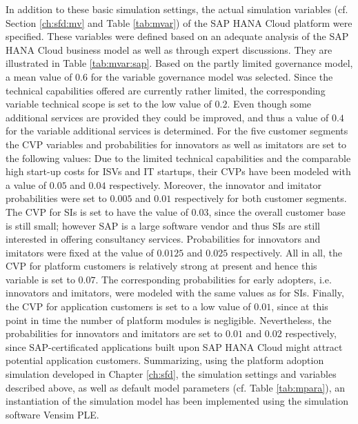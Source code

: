 In addition to these basic simulation settings, the actual simulation variables (cf. Section \ref{ch:sfd:mv} and Table \ref{tab:mvar}) of the SAP HANA Cloud platform were specified. These variables were defined based on an adequate analysis of the SAP HANA Cloud business model as well as through expert discussions. They are illustrated in Table \ref{tab:mvar:sap}. Based on the partly limited governance model, a mean value of $0.6$ for the variable governance model was selected. Since the technical capabilities offered are currently rather limited, the corresponding variable technical scope is set to the low value of $0.2$. Even though some additional services are provided they could be improved, and thus a value of $0.4$ for the variable additional services is determined. For the five customer segments the \ac{CVP} variables and probabilities for innovators as well as imitators are set to the following values: Due to the limited technical capabilities and the comparable high start-up costs for \acp{ISV} and \ac{IT} startups, their \acp{CVP} have been modeled with a value of $0.05$ and $0.04$ respectively. Moreover, the innovator and imitator probabilities were set to $0.005$ and $0.01$ respectively for both customer segments. The \ac{CVP} for \acp{SI} is set to have the value of $0.03$, since the overall customer base is still small; however SAP is a large software vendor and thus \acp{SI} are still interested in offering consultancy services. Probabilities for innovators and imitators were fixed at the value of $0.0125$ and $0.025$ respectively. All in all, the \ac{CVP} for platform customers is relatively strong at present and hence this variable is set to $0.07$. The corresponding probabilities for early adopters, i.e. innovators and imitators, were modeled with the same values as for \acp{SI}. Finally, the \ac{CVP} for application customers is set to a low value of $0.01$, since at this point in time the number of platform modules is negligible. Nevertheless, the probabilities for innovators and imitators are set to $0.01$ and $0.02$ respectively, since SAP-certificated applications built upon SAP HANA Cloud might attract potential application customers. Summarizing, using the platform adoption simulation developed in Chapter \ref{ch:sfd}, the simulation settings and variables described above, as well as default model parameters (cf. Table \ref{tab:mpara}), an instantiation of the simulation model has been implemented using the simulation software Vensim \acs{PLE}.

